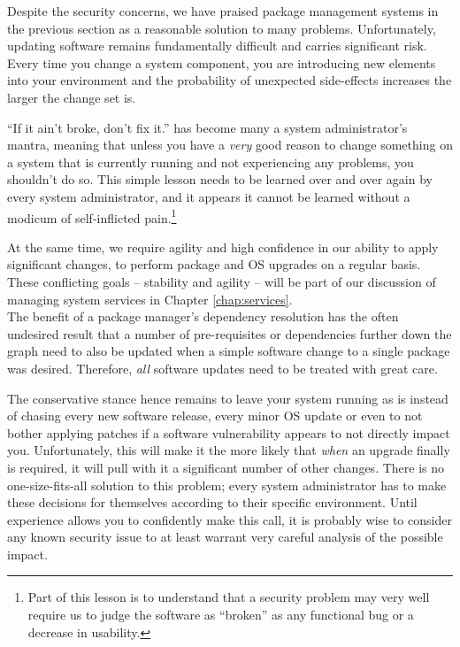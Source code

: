 Despite the security concerns, we have praised package
management systems in the previous section as a
reasonable solution to many problems.  Unfortunately,
updating software remains fundamentally difficult and
carries significant risk.  Every time you change a
system component, you are introducing new elements
into your environment and the probability of
unexpected side-effects increases the larger the
change set is.

``If it ain't broke, don't fix it.''
has become many a system administrator's mantra,
meaning that unless you have a {\em very} good reason
to change something on a system that is currently
running and not experiencing any problems, you
shouldn't do so.  This simple lesson needs to be
learned over and over again by every system
administrator, and it appears it cannot be learned
without a modicum of self-inflicted
pain.\footnote{Part of this lesson is to understand
that a security problem may very well require us to
judge the software as ``broken'' as any functional bug
or a decrease in usability.}

At the same time, we require agility and high
confidence in our ability to apply significant
changes, to perform package and OS upgrades on a
regular basis.  These conflicting goals -- stability
and agility -- will be part of our discussion of
managing system services in Chapter
\ref{chap:services}. \\

The benefit of a package manager's dependency
resolution has the often undesired result that a
number of pre-requisites or dependencies further down
the graph need to also be updated when a simple
software change to a single package was desired.
Therefore, {\em all} software updates need to be
treated with great care.

The conservative stance hence remains to leave your
system running as is instead of chasing every new
software release, every minor OS update or even to not
bother applying patches if a software vulnerability
appears to not directly impact you.  Unfortunately,
this will make it the more likely that {\em when} an
upgrade finally is required, it will pull with it a
significant number of other changes.  There is no
one-size-fits-all solution to this problem; every
system administrator has to make these decisions for
themselves according to their specific environment.
Until experience allows you to confidently make this
call, it is probably wise to consider any known
security issue to at least warrant very careful
analysis of the possible impact.  \\

